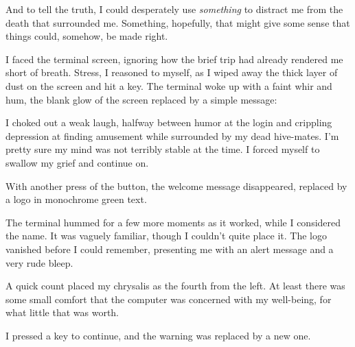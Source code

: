 And to tell the truth, I could desperately use \textit{something} to distract me from the death that surrounded me. Something, hopefully, that might give some sense that things could, somehow, be made right.

I faced the terminal screen, ignoring how the brief trip had already rendered me short of breath. Stress, I reasoned to myself, as I wiped away the thick layer of dust on the screen and hit a key. The terminal woke up with a faint whir and hum, the blank glow of the screen replaced by a simple message:


I choked out a weak laugh, halfway between humor at the login and crippling depression at finding amusement while surrounded by my dead hive-mates. I’m pretty sure my mind was not terribly stable at the time. I forced myself to swallow my grief and continue on.

With another press of the button, the welcome message disappeared, replaced by a logo in monochrome green text.


The terminal hummed for a few more moments as it worked, while I considered the name. It was vaguely familiar, though I couldn’t quite place it. The logo vanished before I could remember, presenting me with an alert message and a very rude bleep.


A quick count placed my chrysalis as the fourth from the left. At least there was some small comfort that the computer was concerned with my well-being, for what little that was worth.

I pressed a key to continue, and the warning was replaced by a new one.


